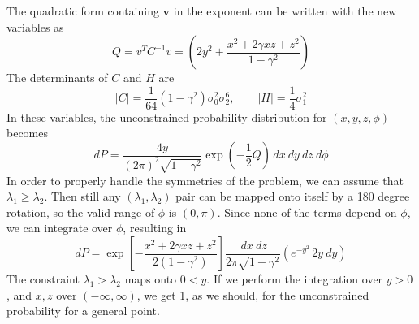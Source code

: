 \documentclass[twocolumn]{emulateapj}
\newcommand{\vv}{\mathbf{v}}
\begin{document}
The quadratic form containing $\vv$ in the exponent can be written with the new 
variables as
\begin{equation}
	Q = v^T C^{-1} v = \left(
		2 y^2	+\frac{x^2 + 2\gamma x z + z^2}{1-\gamma^2}\right)
\end{equation}
The determinants of $C$ and $H$ are 
\begin{equation}
	|C| = \frac{1}{64}(1-\gamma^2)\sigma_0^2\sigma_2^6,\qquad
	|H| = \frac{1}{4} \sigma_1^2
\end{equation}
In these variables, the unconstrained probability distribution for 
$(x,y,z,\phi)$ becomes
\begin{equation}
	dP = \frac{4y}{(2\pi)^2 \sqrt{1-\gamma^2}} \exp(-\frac{1}{2}Q) 
		\,dx\ dy\ dz\ d\phi
\end{equation}
In order to properly handle the symmetries of the problem, we can assume that 
$\lambda_1\geq\lambda_2$. Then still any $(\lambda_1,\lambda_2)$ pair can be 
mapped onto itself by a 180 degree rotation, so the valid range of $\phi$ is 
$(0,\pi)$.  Since none of the terms depend on $\phi$, we can integrate 
over $\phi$, resulting in
\begin{equation}
	dP =  
		 \exp\left[-\frac{x^2 + 2\gamma x z + z^2}{2(1-\gamma^2)}\right] 
			\frac{\,dx\ dz}{2\pi \sqrt{1-\gamma^2}}
		\left( e^{-y^2}\,2y\ dy\right)
\end{equation}
The constraint $\lambda_1>\lambda_2$ maps onto $0<y$. If we perform the 
integration over $y>0$, and $x,z$ over $(-\infty,\infty)$, we get 1, as we 
should, for the unconstrained probability for a general point.
\end{document}
